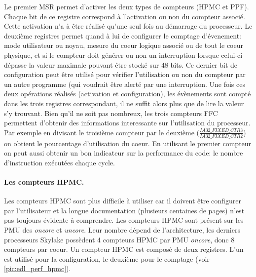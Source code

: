         
        Le premier MSR permet d'activer les deux types de compteurs (HPMC et PPF). Chaque bit de ce registre correspond à l'activation ou non du compteur associé. Cette activation n'a à être réalisé qu'une seul fois au démarrage du processeur. Le deuxième registres permet quand à lui de configurer le comptage d'évenement: mode utilisateur ou noyau, mesure du coeur logique associé ou de tout le coeur physique, et si le compteur doit générer ou non un interruption lorsque celui-ci dépasse la valeur maximale pouvant être stocké sur 48 bits. Ce dernier bit de configuration peut être utilisé pour vérifier l'utilisation ou non du compteur par un autre programme (qui voudrait être alerté par une interruption. Une fois ces deux opérations réalisés (activation et configuration), les évènements sont compté dans les trois registres correspondant, il ne suffit alors plus que de lire la valeur s'y trouvant. Bien qu'il ne soit pas nombreux, les trois compteurs FFC permettent d'obtenir des informations interessante sur l'utilisation du processeur. Par exemple en divisant le troisième compteur par le deuxième ($\frac{IA32\_FIXED\_CTR3}{IA32\_FIXED\_CTR2}$) on obtient le pourcentage d'utilisation du coeur. En utilisant le premier compteur on peut aussi obtenir un bon indicateur sur la performance du code: le nombre d'instruction exécutées chaque cycle.
        
       
        
        
        \paragraph{Les compteurs HPMC.} Les compteurs HPMC sont plus difficile à utiliser car il doivent être configurer par l'utilisateur et la longue documentation (plusieurs centaines de pages) n'est pas toujours évidente à comprendre. Les compteurs HPMC sont présent sur les PMU des \textit{oncore} et \textit{uncore}. Leur nombre dépend de l'architecture, les derniers processeurs Skylake possèdent 4 compteurs HPMC par PMU \textit{oncore}, donc 8 compteurs par coeur. Un compteur HPMC est composé de deux registres. L'un est utilisé pour la configuration, le deuxième pour le comptage (voir \autoref{pic:edl_perf_hpmc}).
        
